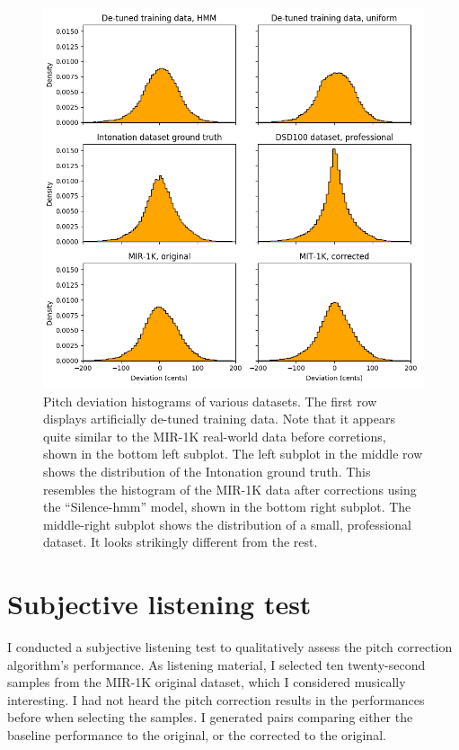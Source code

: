 \begin{figure}[t]
    \centering
    \includegraphics[width=\columnwidth]{figures/dataset-comparison.png}
    \caption{Pitch deviation histograms of various datasets. The first row displays artificially de-tuned training data. Note that it appears quite similar to the MIR-1K real-world data before corretions, shown in the bottom left subplot. The left subplot in the middle row shows the distribution of the Intonation ground truth. This resembles the histogram of the MIR-1K data after corrections using the ``Silence-\gls{hmm}'' model, shown in the bottom right subplot. The middle-right subplot shows the distribution of a small, professional dataset. It looks strikingly different from the rest.}
    \label{fig:dataset-comparison}
\end{figure}



\section{Subjective listening test}
\label{sec:subjective-test}
I conducted a subjective listening test to qualitatively assess the pitch correction algorithm's performance. As listening material, I selected ten twenty-second samples from the MIR-1K original dataset, which I considered musically interesting. I had not heard the pitch correction results in the performances before when selecting the samples. I generated pairs comparing either the baseline performance to the original, or the corrected to the original. 

